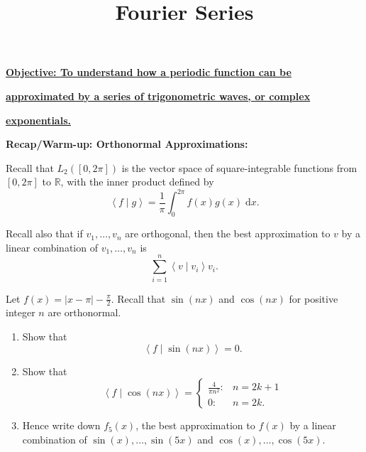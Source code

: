 \documentclass{article}
\newcommand{\diff}{\;\mathrm{d}}
\newcommand{\braket}[2]{\left\langle #1 \mid #2 \right\rangle}
\begin{document}
\title{Fourier Series}
\date{}

\maketitle
\thispagestyle{empty}



\Large

\textbf{\underline{Objective: To understand how a periodic function can be}}

\textbf{\underline{approximated by a series of trigonometric waves, or complex}}

\textbf{\underline{exponentials.}}






\vspace{5mm}



\textbf{Recap/Warm-up: Orthonormal Approximations:}\bigskip



Recall that $L_2([0,2\pi])$ is the vector space of square-integrable functions from $[0,2\pi]$ to $\mathbb{R}$, with the inner product defined by
\[\braket{f}{g}=\frac{1}{\pi}\int_0^{2\pi} f(x)g(x)\diff x.\]

Recall also that if $v_1,\hdots,v_n$ are orthogonal, then the best approximation to $v$ by a linear combination of $v_1,\hdots,v_n$ is
\[\sum_{i=1}^n \braket{v}{v_i}v_i.\]

 Let $f(x)=|x-\pi|-\frac{\pi}{2}$. Recall that $\sin(nx)$ and $\cos(nx)$ for positive integer $n$ are orthonormal.


\begin{enumerate}
	\item Show that
		\[\braket{f}{\sin(nx)} = 0.\]
	\item Show that
		\[\braket{f}{\cos(nx)} =\begin{cases} \frac{4}{\pi n^2}:& n=2k+1\\ 0: & n=2k.\end{cases}\]
	\item Hence write down $f_5(x)$, the best approximation to $f(x)$ by a linear combination of $\sin(x),\hdots,\sin(5x)$ and $\cos(x),\hdots,\cos(5x)$.
\end{enumerate}
\end{document}
